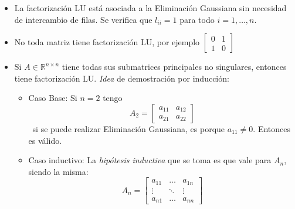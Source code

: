 \begin{itemize}
    \item La factorización LU está asociada a la Eliminación Gaussiana sin necesidad de intercambio de filas. Se verifica que $l_{ii} = 1$ para todo $i = 1,\ldots,n$.
    \item No toda matriz tiene factorización LU, por ejemplo 
    $\begin{bmatrix}
    0 & 1 \\
    1 & 0
    \end{bmatrix}$
    \item Si $A \in \mathbb{R}^{n \times n}$ tiene todas sus submatrices principales no singulares, entonces tiene factorización LU.  \emph{Idea} de demostración por inducción:
    \begin{itemize}
        \item Caso Base: Si $n=2$ tengo 
        \[A_2 = 
        \begin{bmatrix}
            a_{11} & a_{12} \\
            a_{21} & a_{22}
        \end{bmatrix}
        \]
        \
        si se puede realizar Eliminación Gaussiana, es porque $a_{11} \neq 0$. Entonces es válido.
        \item Caso inductivo: La \emph{hipótesis inductiva} que se toma es que vale para $A_{n}$, siendo la misma:
        \[
        A_{n} =
        \begin{bmatrix}
            a_{11} & \ldots & a_{1n} \\
            \vdots & \ddots & \vdots \\
            a_{n1} & \ldots & a_{nn}
        \end{bmatrix}
        \]
        
        \        
        

\end{itemize}
\end{itemize}

